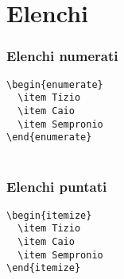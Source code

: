 \section{Elenchi}
\begin{frame}[fragile]\transfade\centering
  \frametitle{Elenchi numerati}
  \verb!\begin{enumerate}!\\
  \verb!  \item Tizio     !\\
  \verb!  \item Caio      !\\
  \verb!  \item Sempronio!\\
  \verb!\end{enumerate}  !\\~
\end{frame}
\begin{frame}[fragile]\transfade\centering
  \frametitle{Elenchi puntati}
  \verb!\begin{itemize}   !\\
  \verb!  \item Tizio     !\\
  \verb!  \item Caio      !\\
  \verb!  \item Sempronio!\\
  \verb!\end{itemize}     !\\~
\end{frame}
